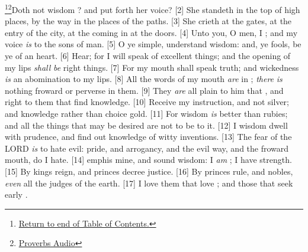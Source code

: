 \footnote{\textcolor[cmyk]{0.99998,1,0,0}{\hyperlink{TOC}{Return to end of Table of Contents.}}}\footnote{\href{https://audiobible.com/bible/proverbs_8.html}{\textcolor[cmyk]{0.99998,1,0,0}{Proverbs Audio}}}\textcolor[cmyk]{0.99998,1,0,0}{Doth not wisdom ? and  put forth her voice?}
[2] \textcolor[cmyk]{0.99998,1,0,0}{She standeth in the top of high places, by the way in the places of the paths.}
[3] \textcolor[cmyk]{0.99998,1,0,0}{She crieth at the gates, at the entry of the city, at the coming in at the doors.}
[4] \textcolor[cmyk]{0.99998,1,0,0}{Unto you, O men, I ; and my voice \emph{is} to the sons of man.}
[5] \textcolor[cmyk]{0.99998,1,0,0}{O ye simple, understand wisdom: and, ye fools, be ye of an  heart.}
[6] \textcolor[cmyk]{0.99998,1,0,0}{Hear; for I will speak of excellent things; and the opening of my lips \emph{shall} \emph{be} right things.}
[7] \textcolor[cmyk]{0.99998,1,0,0}{For my mouth shall speak truth; and wickedness \emph{is} an abomination to my lips.}
[8] \textcolor[cmyk]{0.99998,1,0,0}{All the words of my mouth \emph{are} in ; \emph{there} \emph{is} nothing froward or perverse in them.}
[9] \textcolor[cmyk]{0.99998,1,0,0}{They \emph{are} all plain to him that , and right to them that find knowledge.}
[10] \textcolor[cmyk]{0.99998,1,0,0}{Receive my instruction, and not silver; and knowledge rather than choice gold.}
[11] \textcolor[cmyk]{0.99998,1,0,0}{For wisdom \emph{is} better than rubies; and all the things that may be desired are not to be  to it.}
[12] \textcolor[cmyk]{0.99998,1,0,0}{I wisdom dwell with prudence, and find out knowledge of witty inventions.}
[13] \textcolor[cmyk]{0.99998,1,0,0}{The fear of the LORD \emph{is} to hate evil: pride, and arrogancy, and the evil way, and the froward mouth, do I hate.}
[14] \textcolor[cmyk]{0.99998,1,0,0}{emph{is} mine, and sound wisdom: I \emph{am} ; I have strength.}
[15] \textcolor[cmyk]{0.99998,1,0,0}{By  kings reign, and princes decree justice.}
[16] \textcolor[cmyk]{0.99998,1,0,0}{By  princes rule, and nobles, \emph{even} all the judges of the earth.}
[17] \textcolor[cmyk]{0.99998,1,0,0}{I love them that love ; and those that seek  early .}
